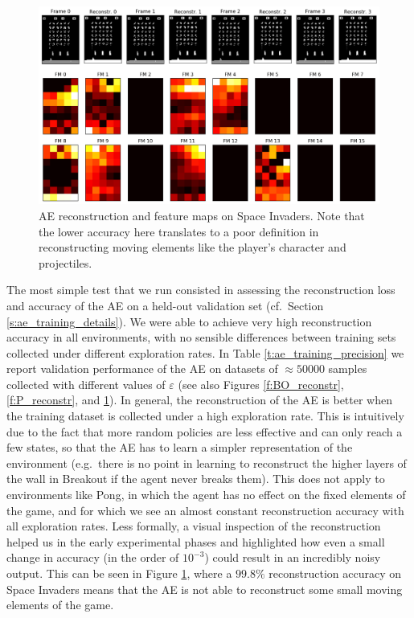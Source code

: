 %
%
\begin{figure}
    \includegraphics[width=\textwidth]{pictures/experiments/reconstr_space_invaders}
    \centering
    \caption[AE reconstruction and feature maps on Space Invaders]{AE 
	    reconstruction and feature maps on Space Invaders. Note that the 
	    lower accuracy here translates to a poor definition in 
	    reconstructing moving elements like the player's character and 
	    projectiles.}
    \label{f:SI_reconstr}
\end{figure}
%

The most simple test that we run consisted in assessing the reconstruction loss
and accuracy of the AE on a held-out validation set (cf.\ Section \ref{s:ae_training_details}). 
We were able to achieve very high reconstruction accuracy in all environments, 
with no sensible differences between training sets collected under different 
exploration rates. In Table \ref{t:ae_training_precision} we report validation 
performance of the AE on datasets of $\approx50000$ samples collected with 
different values of $\varepsilon$ (see also Figures \ref{f:BO_reconstr}, 
\ref{f:P_reconstr}, and \ref{f:SI_reconstr}). 
In general, the reconstruction of the AE is better when the training dataset is
collected under a high exploration rate. This is intuitively due to the fact 
that more random policies are less effective and can only reach a few states, so
that the AE has to learn a simpler representation of the environment (e.g.\ 
there is no point in learning to reconstruct the higher layers of the wall in 
Breakout if the agent never breaks them).
This does not apply to environments like Pong, in which the agent has no effect 
on the fixed elements of the game, and for which we see an almost constant
reconstruction accuracy with all exploration rates. 
Less formally, a visual inspection of the reconstruction helped us in the early 
experimental phases and highlighted how even a small change in accuracy (in the
order of $10^{-3}$) could result in an incredibly noisy output. This can be
seen in Figure \ref{f:SI_reconstr}, where a $99.8\%$ reconstruction accuracy 
on Space Invaders means that the AE is not able to reconstruct some small moving 
elements of the game.

